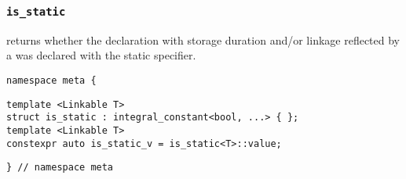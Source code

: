

\subsubsection{\texttt{is\_static}}

returns whether the declaration with storage duration and/or linkage reflected by a  was declared with the static specifier.

\begin{verbatim}
namespace meta {
\end{verbatim}
\begin{verbatim}
template <Linkable T>
struct is_static : integral_constant<bool, ...> { };
template <Linkable T>
constexpr auto is_static_v = is_static<T>::value;
\end{verbatim}
\begin{verbatim}
} // namespace meta
\end{verbatim}

